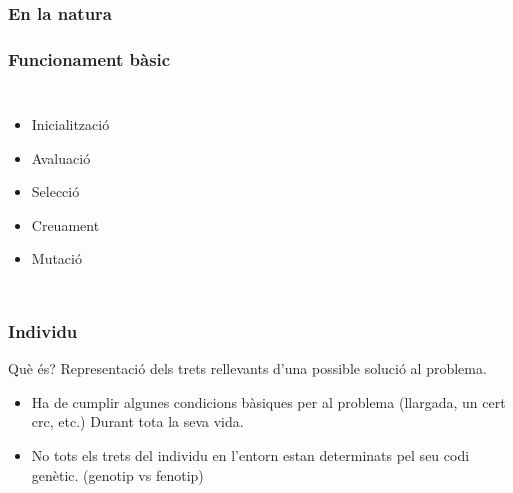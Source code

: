 \documentclass{beamer}
\begin{document}
\begin{frame}
	\frametitle{En la natura}
	\pause
\end{frame}

\begin{frame}
	\frametitle{Funcionament bàsic}
	\begin{columns}[c]
		\begin{itemize}
			\item Inicialització
			\item Avaluació
			\item Selecció
			\item Creuament
			\item Mutació
		\end{itemize}
	\end{columns}
\end{frame}

\begin{frame}
	\frametitle{Individu}
	\begin{block}{Què és?}
		Representació dels trets rellevants d'una possible solució al problema.
	 \end{block}
	\pause
	\begin{itemize}
		\item Ha de cumplir algunes condicions bàsiques per al problema (llargada, un cert crc,
			etc.) Durant tota la seva vida.
		\item No tots els trets del individu en l'entorn estan determinats pel seu codi genètic.
			(genotip vs fenotip)
	\end{itemize}
\end{frame}
\end{document}
